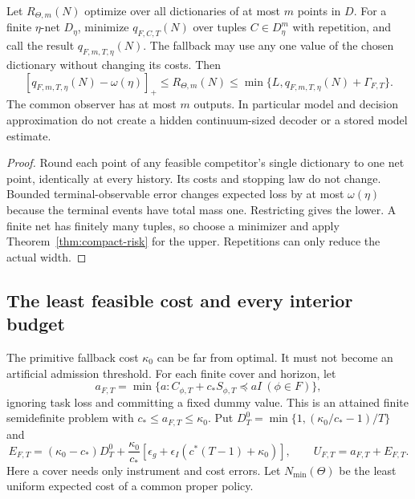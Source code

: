 \begin{corollary}\label{cor:compact-width}
Let $R_{\Theta,m}(N)$ optimize over all dictionaries of at most $m$ points in $D$. For a finite $\eta$-net $D_\eta$, minimize $q_{F,C,T}(N)$ over tuples $C\in D_\eta^m$ with repetition, and call the result $q_{F,m,T,\eta}(N)$. The fallback may use any one value of the chosen dictionary without changing its costs. Then
\[
 [q_{F,m,T,\eta}(N)-\omega(\eta)]_+
 \le R_{\Theta,m}(N)
 \le\min\{L,q_{F,m,T,\eta}(N)+\Gamma_{F,T}\}.
\]
The common observer has at most $m$ outputs. In particular model and decision approximation do not create a hidden continuum-sized decoder or a stored model estimate.
\end{corollary}
\begin{proof}
Round each point of any feasible competitor's single dictionary to one net point, identically at every history. Its costs and stopping law do not change. Bounded terminal-observable error changes expected loss by at most $\omega(\eta)$ because the terminal events have total mass one. Restricting gives the lower. A finite net has finitely many tuples, so choose a minimizer and apply Theorem~\ref{thm:compact-risk} for the upper. Repetitions can only reduce the actual width.
\end{proof}

\subsection{The least feasible cost and every interior budget}
The primitive fallback cost $\kappa_0$ can be far from optimal. It must not become an artificial admission threshold. For each finite cover and horizon, let
\[
 a_{F,T}=\min\{a:C_{\phi,T}+c_*S_{\phi,T}\preccurlyeq aI\ (\phi\in F)\},
\]
ignoring task loss and committing a fixed dummy value. This is an attained finite semidefinite problem with $c_*\le a_{F,T}\le\kappa_0$. Put $D_T^0=\min\{1,(\kappa_0/c_*-1)/T\}$ and
\begin{equation}\label{eq:compact-cost-certificate}
 E_{F,T}=(\kappa_0-c_*)D_T^0+
 \frac{\kappa_0}{c_*}[\epsilon_g+
                  \epsilon_I(c^*(T-1)+\kappa_0)],\qquad
 U_{F,T}=a_{F,T}+E_{F,T}.
\end{equation}
Here a cover needs only instrument and cost errors. Let $N_{\min}(\Theta)$ be the least uniform expected cost of a common proper policy.

